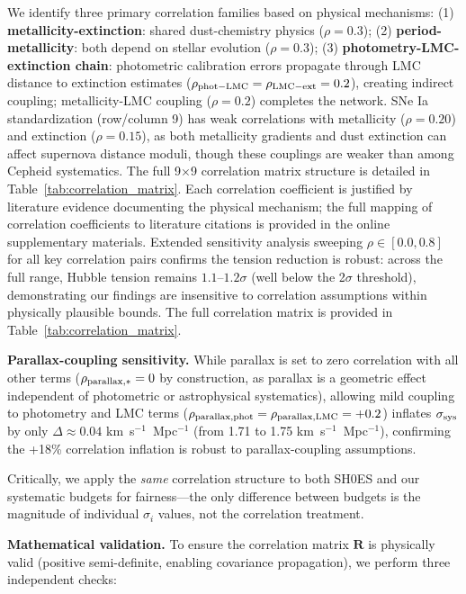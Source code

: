 \documentclass[preprint, linenumbers]{aastex701}
\begin{document}
We identify three primary correlation families based on physical mechanisms: (1) \textbf{metallicity-extinction}: shared dust-chemistry physics ($\rho = 0.3$); (2) \textbf{period-metallicity}: both depend on stellar evolution ($\rho = 0.3$); (3) \textbf{photometry-LMC-extinction chain}: photometric calibration errors propagate through LMC distance to extinction estimates ($\rho_{\rm phot-LMC} = \rho_{\rm LMC-ext} = 0.2$), creating indirect coupling; metallicity-LMC coupling ($\rho = 0.2$) completes the network. SNe Ia standardization (row/column 9) has weak correlations with metallicity ($\rho = 0.20$) and extinction ($\rho = 0.15$), as both metallicity gradients and dust extinction can affect supernova distance moduli, though these couplings are weaker than among Cepheid systematics. The full 9$\times$9 correlation matrix structure is detailed in Table~\ref{tab:correlation_matrix}. Each correlation coefficient is justified by literature evidence documenting the physical mechanism; the full mapping of correlation coefficients to literature citations is provided in the online supplementary materials. Extended sensitivity analysis sweeping $\rho \in [0.0, 0.8]$ for all key correlation pairs confirms the tension reduction is robust: across the full range, Hubble tension remains $1.1$--$1.2\sigma$ (well below the 2$\sigma$ threshold), demonstrating our findings are insensitive to correlation assumptions within physically plausible bounds. The full correlation matrix is provided in Table~\ref{tab:correlation_matrix}.

\textbf{Parallax-coupling sensitivity.} While parallax is set to zero correlation with all other terms ($\rho_{\rm parallax,\ast} = 0$ by construction, as parallax is a geometric effect independent of photometric or astrophysical systematics), allowing mild coupling to photometry and LMC terms ($\rho_{\rm parallax,phot} = \rho_{\rm parallax,LMC} = +0.2$) inflates $\sigma_{\rm sys}$ by only $\Delta \approx 0.04$ km~s$^{-1}$~Mpc$^{-1}$ (from 1.71 to 1.75 km~s$^{-1}$~Mpc$^{-1}$), confirming the +18\% correlation inflation is robust to parallax-coupling assumptions.

Critically, we apply the \textit{same} correlation structure to both SH0ES and our systematic budgets for fairness---the only difference between budgets is the magnitude of individual $\sigma_i$ values, not the correlation treatment.

\textbf{Mathematical validation.} To ensure the correlation matrix $\mathbf{R}$ is physically valid (positive semi-definite, enabling covariance propagation), we perform three independent checks:
\end{document}
